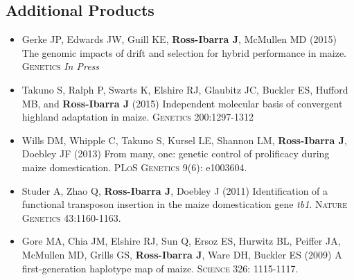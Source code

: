 \subsection*{Additional Products}

\begin{itemize} \setlength{\itemsep}{0pt} \setlength{\parskip}{2pt} \setlength{\parsep}{0pt}

\item Gerke JP, Edwards JW, Guill KE, {\bf Ross-Ibarra J}, McMullen MD (2015) The genomic impacts of drift and selection for hybrid performance in maize. \textsc{Genetics} \emph{In Press}

\item Takuno S, Ralph P, Swarts K, Elshire RJ, Glaubitz JC, Buckler ES, Hufford MB, and {\bf Ross-Ibarra J} (2015) Independent molecular basis of convergent highland adaptation in maize. \textsc{Genetics} 200:1297-1312

\item Wills DM, Whipple C, Takuno S, Kursel LE, Shannon LM, {\bf Ross-Ibarra J}, Doebley JF (2013) From many, one: genetic control of prolificacy during maize domestication. \textsc{PLoS Genetics} 9(6): e1003604. 

\item Studer A, Zhao Q, {\bf Ross-Ibarra J}, Doebley J (2011) Identification of a functional transposon insertion in the maize domestication gene \emph{tb1}.  \textsc{Nature Genetics} 43:1160-1163.






\item Gore MA, Chia JM, Elshire RJ, Sun Q, Ersoz ES, Hurwitz BL, Peiffer JA, McMullen MD, Grills GS, {\bf Ross-Ibarra J}, Ware DH, Buckler ES (2009) A first-generation haplotype map of maize.  \textsc{Science 326}: 1115-1117.

\end{itemize}

